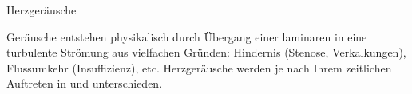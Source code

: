  
\TextSlide
{Herzgeräusche}
{%
% 
%
Geräusche entstehen physikalisch durch Übergang einer
laminaren in eine turbulente Strömung aus vielfachen Gründen:
Hindernis (Stenose, Verkalkungen), Flussumkehr
(Insuffizienz), etc. Herzgeräusche werden je nach Ihrem
zeitlichen Auftreten  in  und 
unterschieden.

% 
%
%   
%   
}
{\MoveDown}
{}
{}
{}




